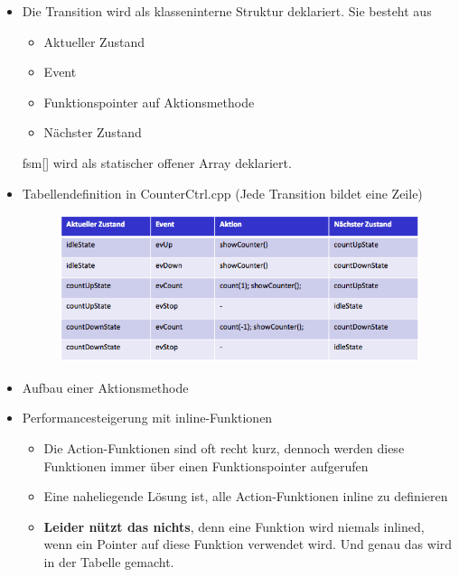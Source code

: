 \begin{itemize}
      \item Die Transition wird als klasseninterne Struktur deklariert. Sie besteht
            aus
            \begin{itemize}
                  \item Aktueller Zustand
                  \item Event
                  \item Funktionspointer auf Aktionsmethode
                  \item Nächster Zustand
            \end{itemize}
            fsm[] wird als statischer offener Array deklariert.
            

      \item Tabellendefinition in CounterCtrl.cpp (Jede Transition bildet eine Zeile)
            \begin{figure}[H]
                  \centering
                  \includegraphics[scale = 0.5]{images/FSM/tabelle}
            \end{figure}
            

      \item Aufbau einer Aktionsmethode
            

      \item Performancesteigerung mit inline-Funktionen
            \begin{itemize}
                  \item Die Action-Funktionen sind oft recht kurz, dennoch werden diese Funktionen immer über einen Funktionspointer aufgerufen
                  \item Eine naheliegende Lösung ist, alle Action-Funktionen inline zu definieren
                  \item \textbf{Leider nützt das nichts}, denn eine Funktion wird niemals inlined, wenn ein Pointer auf diese Funktion verwendet wird. Und genau das wird in der Tabelle gemacht.
            \end{itemize}


\end{itemize}
